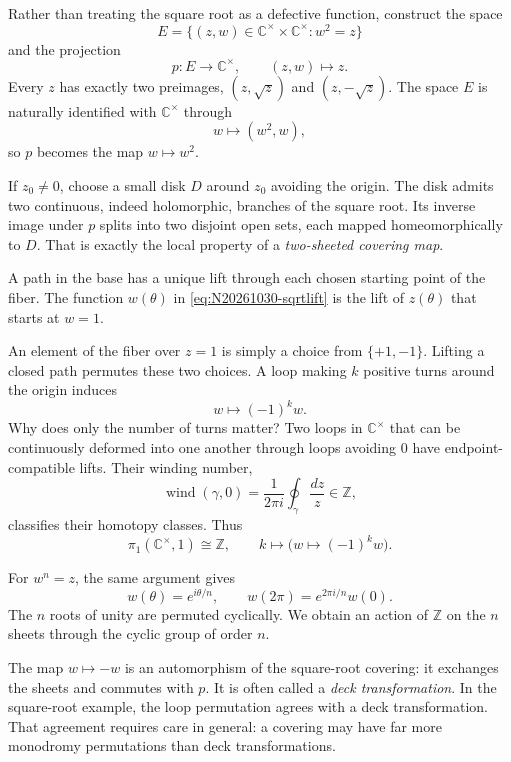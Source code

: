 Rather than treating the square root as a defective function, construct the space
\[
 E=\{(z,w)\in\mathbb C^\times\times\mathbb C^\times:w^2=z\}
\]
and the projection
\[
 p:E\longrightarrow\mathbb C^\times,\qquad(z,w)\longmapsto z.
\]
Every \(z\) has exactly two preimages, \((z,\sqrt z)\) and \((z,-\sqrt z)\). The space \(E\) is naturally identified with \(\mathbb C^\times\) through
\[
 w\longmapsto(w^2,w),
\]
so \(p\) becomes the map \(w\mapsto w^2\).

If \(z_0\ne0\), choose a small disk \(D\) around \(z_0\) avoiding the origin. The disk admits two continuous, indeed holomorphic, branches of the square root. Its inverse image under \(p\) splits into two disjoint open sets, each mapped homeomorphically to \(D\). That is exactly the local property of a \emph{two-sheeted covering map}.

A path in the base has a unique lift through each chosen starting point of the fiber. The function \(w(\theta)\) in \eqref{eq:N20261030-sqrtlift} is the lift of \(z(\theta)\) that starts at \(w=1\).

An element of the fiber over \(z=1\) is simply a choice from \(\{+1,-1\}\). Lifting a closed path permutes these two choices. A loop making \(k\) positive turns around the origin induces
\begin{equation}
 w\longmapsto(-1)^k w.
 \label{eq:N20261030-winding}
\end{equation}
Why does only the number of turns matter? Two loops in \(\mathbb C^\times\) that can be continuously deformed into one another through loops avoiding \(0\) have endpoint-compatible lifts. Their winding number,
\[
 \operatorname{wind}(\gamma,0)
 =\frac{1}{2\pi i}\oint_\gamma\frac{dz}{z}\in\mathbb Z,
\]
classifies their homotopy classes. Thus
\[
 \pi_1(\mathbb C^\times,1)\cong\mathbb Z,
 \qquad
 k\longmapsto\bigl(w\mapsto(-1)^kw\bigr).
\]

For \(w^n=z\), the same argument gives
\[
 w(\theta)=e^{i\theta/n},\qquad
 w(2\pi)=e^{2\pi i/n}w(0).
\]
The \(n\) roots of unity are permuted cyclically. We obtain an action of \(\mathbb Z\) on the \(n\) sheets through the cyclic group of order \(n\).

The map \(w\mapsto -w\) is an automorphism of the square-root covering: it exchanges the sheets and commutes with \(p\). It is often called a \emph{deck transformation}. In the square-root example, the loop permutation agrees with a deck transformation. That agreement requires care in general: a covering may have far more monodromy permutations than deck transformations.

